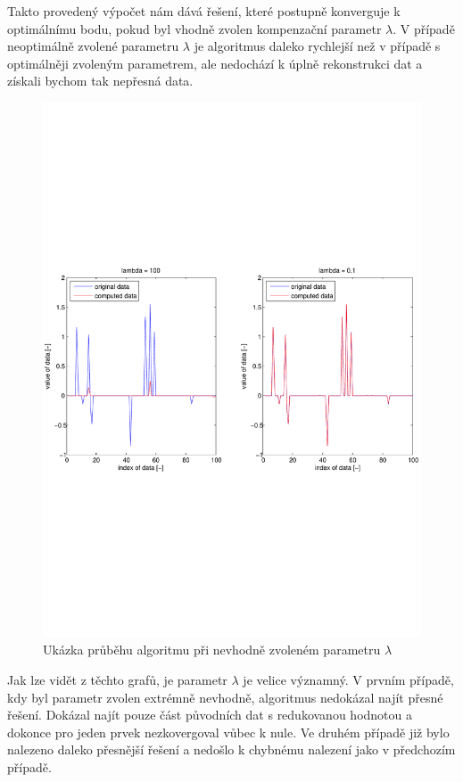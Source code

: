 \documentclass[FM,BP]{tulthesis}
\begin{document}
Takto provedený výpočet nám dává řešení, které postupně konverguje k optimálnímu bodu, pokud byl vhodně zvolen kompenzační parametr $\lambda$. V případě neoptimálně zvolené parametru $\lambda$ je algoritmus daleko rychlejší než v případě s optimálněji zvoleným parametrem, ale nedochází k úplně rekonstrukci dat a získali bychom tak nepřesná data.
\begin{figure}[!ht]
	\begin{center}
		\includegraphics[scale=0.72]{obr/lambda.pdf}
	\end{center}
	\caption{Ukázka průběhu algoritmu při nevhodně zvoleném parametru $\lambda$}
	\label{fig:basicLambda}
\end{figure}

Jak lze vidět z těchto grafů, je parametr $\lambda$ je velice významný. V prvním případě, kdy byl parametr zvolen extrémně nevhodně, algoritmus nedokázal najít přesné řešení. Dokázal najít pouze část původních dat s redukovanou hodnotou a dokonce pro jeden prvek nezkovergoval vůbec k nule. Ve druhém případě již bylo nalezeno daleko přesnější řešení a nedošlo k chybnému nalezení jako v předchozím případě.
\end{document}
